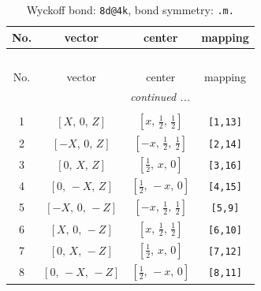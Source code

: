 \documentclass[fleqn,8pt]{jsarticle}
\begin{document}
\begin{longtable}{cccc}
\caption{Wyckoff bond: {\tt 8d@4k}, bond symmetry: {\tt .m.}}
 \\
 \hline \hline
No. & vector & center & mapping \\ \hline \endfirsthead

\multicolumn{3}{l}{\tablename\ \thetable{}} \\
 \hline \hline
No. & vector & center & mapping \\ \hline \endhead

 \hline \hline
\multicolumn{3}{r}{\footnotesize\it continued ...} \\ \endfoot

 \hline \hline
\multicolumn{3}{r}{} \\ \endlastfoot

1 & $\left[ X,\, 0,\, Z \right]$ & $\left[ x,\, \frac{1}{2},\, \frac{1}{2} \right]$ & {\tt [1,13]} \\ \hline
2 & $\left[ - X,\, 0,\, Z \right]$ & $\left[ - x,\, \frac{1}{2},\, \frac{1}{2} \right]$ & {\tt [2,14]} \\ \hline
3 & $\left[ 0,\, X,\, Z \right]$ & $\left[ \frac{1}{2},\, x,\, 0 \right]$ & {\tt [3,16]} \\ \hline
4 & $\left[ 0,\, - X,\, Z \right]$ & $\left[ \frac{1}{2},\, - x,\, 0 \right]$ & {\tt [4,15]} \\ \hline
5 & $\left[ - X,\, 0,\, - Z \right]$ & $\left[ - x,\, \frac{1}{2},\, \frac{1}{2} \right]$ & {\tt [5,9]} \\ \hline
6 & $\left[ X,\, 0,\, - Z \right]$ & $\left[ x,\, \frac{1}{2},\, \frac{1}{2} \right]$ & {\tt [6,10]} \\ \hline
7 & $\left[ 0,\, X,\, - Z \right]$ & $\left[ \frac{1}{2},\, x,\, 0 \right]$ & {\tt [7,12]} \\ \hline
8 & $\left[ 0,\, - X,\, - Z \right]$ & $\left[ \frac{1}{2},\, - x,\, 0 \right]$ & {\tt [8,11]} \\
\end{longtable}
\renewcommand{\arraystretch}{1.2}
\end{document}
